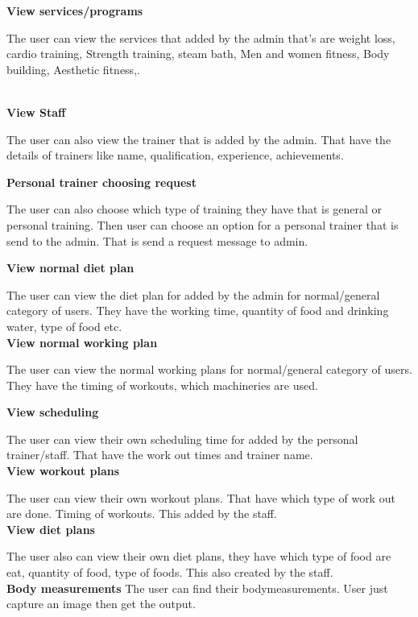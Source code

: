 \documentclass[a4paper,12pt,toc=flat]{report}
\begin{document}
{	
	{\bf \hspace{-20pt}View services/programs}
	
	
	The user can view the services that added by the admin that’s are weight loss, cardio training, Strength training, steam bath, Men and women fitness, Body building, Aesthetic fitness,.
 
	\\
	{\bf \hspace{-20pt}View Staff}
	
	The user can also view the trainer that is added by the admin. That have the details of trainers like name, qualification, experience, achievements.

	
	{\bf \hspace{-20pt}Personal trainer choosing request}
	
	The user can also choose which type of training they have that is general or personal training. Then user can choose an option for a personal trainer that is send to the admin. That is send a request message to admin.
	
	
	
	{\bf \hspace{-20pt}View normal diet plan}
	
	The user can view the diet plan for added by the admin for normal/general category of users.
	They have the working time,  quantity of food and drinking water, type of food etc.
	\\
	{\bf \hspace{-20pt}View normal working plan}
	
	The user can view the normal working plans for normal/general category of users. They have the timing of workouts, which machineries are used.
	
	
	{\bf \hspace{-20pt}View scheduling}
	
	The user can view their own scheduling time for added by the personal trainer/staff. That have the work out times and trainer name.	\pagebreak
	\\
	{\bf \hspace{-20pt}View workout plans}
	
	The user can view their own workout plans. That have which type of work out are done. Timing of workouts. This added by the staff. 
	\\
	{\bf \hspace{-20pt}View diet plans}
	
	The user also can view their own diet plans, they have which type of food are eat, quantity of food, type of foods. This also created by the staff.
	\\
		{\bf \hspace{-20pt} Body measurements}
		The user can find their bodymeasurements. User just capture an image then get the output.\\
		
}
\end{document}
